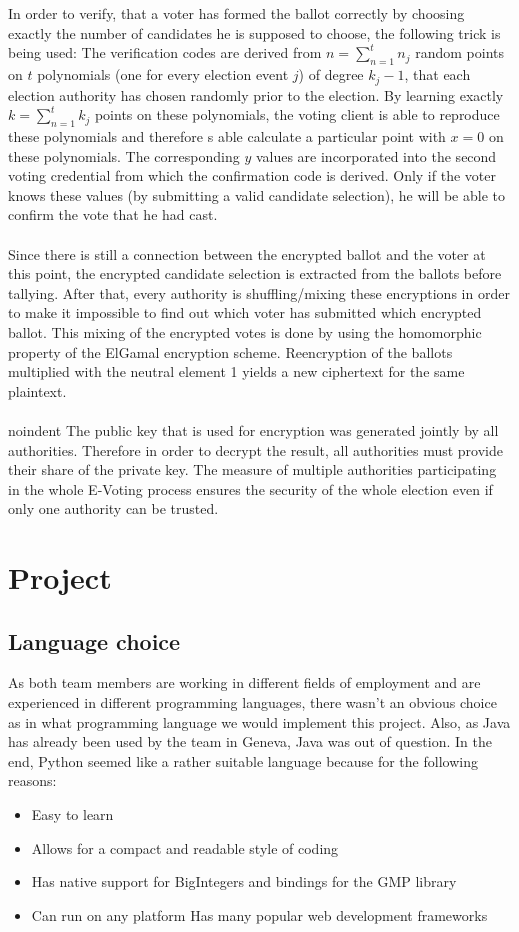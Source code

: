 \documentclass[a4paper,12pt]{report}
\theoremstyle{definition}
\begin{document}
\\\\\noindent In order to verify, that a voter has formed the ballot correctly by choosing exactly the number of candidates he is supposed to choose, the following trick is being used: The verification codes are derived from $n = \sum_{n=1}^{t} n_j$ random points on $t$ polynomials (one for every election event $j$) of degree $k_j - 1$, that each election authority has chosen randomly prior to the election. By learning exactly $k = \sum_{n=1}^{t} k_j$ points on these polynomials, the voting client is able to reproduce these polynomials and therefore s able calculate a particular point with $x=0$ on these polynomials. The corresponding $y$ values are incorporated into the second voting credential from which the confirmation code is derived. Only if the voter knows these values (by submitting a valid candidate selection), he will be able to confirm the vote that he had cast.
\\\\\noindent Since there is still a connection between the encrypted ballot and the voter at this point, the encrypted candidate selection is extracted from the ballots before tallying. After that, every authority is shuffling/mixing these encryptions in order to make it impossible to find out which voter has submitted which encrypted ballot. This mixing of the encrypted votes is done by using the homomorphic property of the ElGamal encryption scheme. Reencryption of the ballots multiplied with the neutral element 1 yields a new ciphertext for the same plaintext.
\\\\noindent The public key that is used for encryption was generated jointly by all authorities. Therefore in order to decrypt the result, all authorities must provide their share of the private key. The measure of multiple authorities participating in the whole E-Voting process ensures the security of the whole election even if only one authority can be trusted.
\chapter{Project}
\section{Language choice}
As both team members are working in different fields of employment and are experienced in different programming languages, there wasn't an obvious choice as in what programming language we would implement this project. Also, as Java has already been used by the team in Geneva, Java was out of question. In the end, Python seemed like a rather suitable language because for the following reasons:
\begin{itemize}
	\item Easy to learn
	\item Allows for a compact and readable style of coding
	\item Has native support for BigIntegers and bindings for the GMP library
	\item Can run on any platform
	\items Has many popular web development frameworks
\end{itemize}
\end{document}
